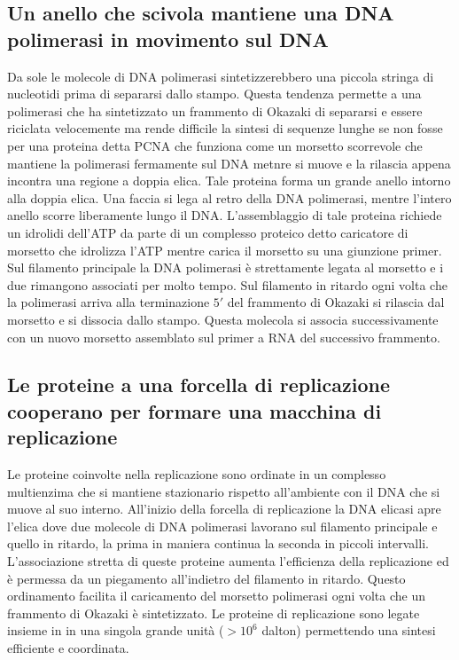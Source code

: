 \subsection{Un anello che scivola mantiene una DNA polimerasi in movimento sul DNA}
Da sole le molecole di DNA polimerasi sintetizzerebbero una piccola stringa di nucleotidi prima di separarsi dallo stampo. Questa tendenza permette a una polimerasi che ha sintetizzato 
un frammento di Okazaki di separarsi e essere riciclata velocemente ma rende difficile la sintesi di sequenze lunghe se non fosse per una proteina detta PCNA che funziona come un
morsetto scorrevole che mantiene la polimerasi fermamente sul DNA metnre si muove e la rilascia appena incontra una regione a doppia elica. Tale proteina forma un grande anello intorno
alla doppia elica. Una faccia si lega al retro della DNA polimerasi, mentre l'intero anello scorre liberamente lungo il DNA. L'assemblaggio di tale proteina richiede un idrolidi 
dell'ATP da parte di un complesso proteico detto caricatore di morsetto che idrolizza l'ATP mentre carica il morsetto su una giunzione primer. Sul filamento principale la DNA polimerasi
\`e strettamente legata al morsetto e i due rimangono associati per molto tempo. Sul filamento in ritardo ogni volta che la polimerasi arriva alla terminazione $5'$ del frammento di 
Okazaki si rilascia dal morsetto e si dissocia dallo stampo. Questa molecola si associa successivamente con un nuovo morsetto assemblato sul primer a RNA del successivo frammento.
\subsection{Le proteine a una forcella di replicazione cooperano per formare una macchina di replicazione}
Le proteine coinvolte nella replicazione sono ordinate in un complesso multienzima che si mantiene stazionario rispetto all'ambiente con il DNA che si muove al suo interno. All'inizio
della forcella di replicazione la DNA elicasi apre l'elica dove due molecole di DNA polimerasi lavorano sul filamento principale e quello in ritardo, la prima in maniera continua la
seconda in piccoli intervalli. L'associazione stretta di queste proteine aumenta l'efficienza della replicazione ed \`e permessa da un piegamento all'indietro del filamento in 
ritardo. Questo ordinamento facilita il caricamento del morsetto polimerasi ogni volta che un frammento di Okazaki \`e sintetizzato. Le proteine di replicazione sono legate insieme in
in una singola grande unit\`a ($>10^6$ dalton) permettendo una sintesi efficiente e coordinata. 
